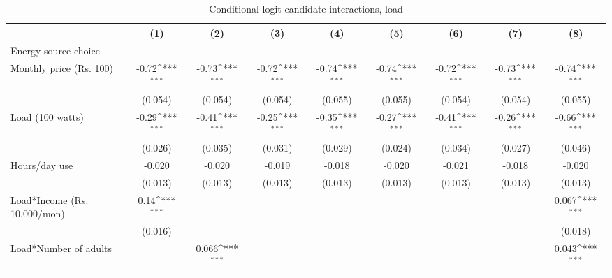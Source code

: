 \begin{table}[htbp]\centering
\def\sym#1{\ifmmode^{#1}\else\(^{#1}\)\fi}
\caption{Conditional logit candidate interactions, load}
\begin{tabular*}{1\hsize}{@{\hskip\tabcolsep\extracolsep\fill}l*{8}{c}}
\toprule
                &\multicolumn{1}{c}{(1)}         &\multicolumn{1}{c}{(2)}         &\multicolumn{1}{c}{(3)}         &\multicolumn{1}{c}{(4)}         &\multicolumn{1}{c}{(5)}         &\multicolumn{1}{c}{(6)}         &\multicolumn{1}{c}{(7)}         &\multicolumn{1}{c}{(8)}         \\
\midrule
Energy source choice&                  &                  &                  &                  &                  &                  &                  &                  \\
Monthly price (Rs. 100)&    -0.72\sym{***}&    -0.73\sym{***}&    -0.72\sym{***}&    -0.74\sym{***}&    -0.74\sym{***}&    -0.72\sym{***}&    -0.73\sym{***}&    -0.74\sym{***}\\
                &  (0.054)         &  (0.054)         &  (0.054)         &  (0.055)         &  (0.055)         &  (0.054)         &  (0.054)         &  (0.055)         \\
Load (100 watts)&    -0.29\sym{***}&    -0.41\sym{***}&    -0.25\sym{***}&    -0.35\sym{***}&    -0.27\sym{***}&    -0.41\sym{***}&    -0.26\sym{***}&    -0.66\sym{***}\\
                &  (0.026)         &  (0.035)         &  (0.031)         &  (0.029)         &  (0.024)         &  (0.034)         &  (0.027)         &  (0.046)         \\
Hours/day use   &   -0.020         &   -0.020         &   -0.019         &   -0.018         &   -0.020         &   -0.021         &   -0.018         &   -0.020         \\
                &  (0.013)         &  (0.013)         &  (0.013)         &  (0.013)         &  (0.013)         &  (0.013)         &  (0.013)         &  (0.013)         \\
Load*Income (Rs. 10,000/mon)&     0.14\sym{***}&                  &                  &                  &                  &                  &                  &    0.067\sym{***}\\
                &  (0.016)         &                  &                  &                  &                  &                  &                  &  (0.018)         \\
Load*Number of adults&                  &    0.066\sym{***}&                  &                  &                  &                  &                  &    0.043\sym{***}\\

\end{tabular*}
\end{table}
